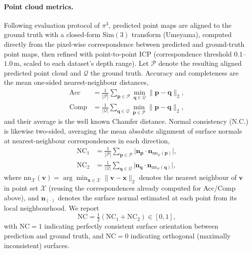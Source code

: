 \paragraph{Point cloud metrics.}
Following evaluation protocol of $\pi^3$\citep{wang2025pi}, predicted point
maps are aligned to the ground truth with a closed-form
$\mathrm{Sim}(3)$ transform (Umeyama), computed directly from the
pixel-wise correspondence between predicted and ground-truth point
maps, then refined with point-to-point ICP (correspondence threshold
$0.1$--$1.0\,\mathrm{m}$, scaled to each dataset's depth range). Let
$\mathcal{P}$ denote the resulting aligned predicted point cloud and
$\mathcal{Q}$ the ground truth. Accuracy and completeness are the
mean one-sided nearest-neighbour distances,
%
\begin{align}
\mathrm{Acc} &= \tfrac{1}{|\mathcal{P}|}\textstyle\sum_{\mathbf{p}\in\mathcal{P}}
\min_{\mathbf{q}\in\mathcal{Q}}\|\mathbf{p}-\mathbf{q}\|_2 ,
\\[2pt]
\mathrm{Comp} &= \tfrac{1}{|\mathcal{Q}|}\textstyle\sum_{\mathbf{q}\in\mathcal{Q}}
\min_{\mathbf{p}\in\mathcal{P}}\|\mathbf{p}-\mathbf{q}\|_2 ,
\end{align}
%
and their average is the well known Chamfer distance.
Normal consistency (N.C.) is likewise two-sided, averaging the mean absolute
alignment of surface normals at nearest-neighbour correspondences in
each direction,
%
\begin{align}
\mathrm{NC}_1 &= \tfrac{1}{|\mathcal{P}|}\textstyle\sum_{\mathbf{p}\in\mathcal{P}}
\big|\mathbf{n}_{\mathbf{p}} \cdot \mathbf{n}_{\mathrm{nn}_{\mathcal{Q}}(\mathbf{p})}\big| ,
\\[2pt]
\mathrm{NC}_2 &= \tfrac{1}{|\mathcal{Q}|}\textstyle\sum_{\mathbf{q}\in\mathcal{Q}}
\big|\mathbf{n}_{\mathbf{q}} \cdot \mathbf{n}_{\mathrm{nn}_{\mathcal{P}}(\mathbf{q})}\big| ,
\end{align}
%
where $\mathrm{nn}_{\mathcal{X}}(\mathbf{v}) = \arg\min_{\mathbf{x}\in\mathcal{X}}\|\mathbf{v}-\mathbf{x}\|_2$
denotes the nearest neighbour of $\mathbf{v}$ in point set $\mathcal{X}$ (reusing the
correspondences already computed for Acc/Comp above), and $\mathbf{n}_{(\cdot)}$
denotes the surface normal estimated at each point from its local neighbourhood.
We report
\begin{equation}
\mathrm{NC} = \tfrac{1}{2}(\mathrm{NC}_1 + \mathrm{NC}_2) \in [0,1],
\end{equation}
with $\mathrm{NC}=1$ indicating perfectly consistent surface orientation between
prediction and ground truth, and $\mathrm{NC}=0$ indicating orthogonal (maximally
inconsistent) surfaces.



